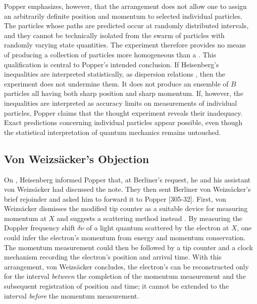 \documentclass[pdflatex]{sn-jnl}
\newcommand{\vW}{von Weizsäcker\xspace}
\newcommand{\VW}{Von Weizsäcker\xspace}
\begin{document}
Popper emphasizes, however, that the arrangement does not allow one to assign an arbitrarily definite position and momentum to selected individual particles. The particles whose paths are predicted occur at randomly distributed intervals, and they cannot be technically isolated from the swarm of particles with randomly varying state quantities. The experiment therefore provides no means of producing a collection of particles more homogeneous than a . This qualification is central to Popper's intended conclusion. If Heisenberg's inequalities are interpreted statistically, as dispersion relations , then the experiment does not undermine them. It does not produce an ensemble of $B$ particles all having both sharp position and sharp momentum. If, however, the inequalities are interpreted as accuracy limits  on measurements of individual particles, Popper claims that the thought experiment reveals their inadequacy. Exact predictions concerning individual particles appear possible, even though the statistical interpretation of quantum mechanics remains untouched.

\subsection{\VW's Objection}

On , Heisenberg informed Popper that, at Berliner’s request, he and his assistant \vW had discussed the note. They then sent Berliner \vW's brief rejoinder and asked him to forward it to Popper [305-32]. First, \vW dismisses the modified tip counter as a suitable device for measuring momentum at $X$ and suggests a scattering method instead \citep[808]{Weizsäcker1934}. By measuring the Doppler frequency shift $\delta\nu$ of a light quantum scattered by the electron at $X$, one could infer the electron's momentum from energy and momentum conservation. The momentum measurement could then be followed by a tip counter and a clock mechanism recording the electron's position and arrival time. With this arrangement, \vW concludes, the electron's  can be reconstructed only for the interval \emph{between} the completion of the momentum measurement and the subsequent registration of position and time; it cannot be extended to the interval \emph{before} the momentum measurement.
\end{document}
